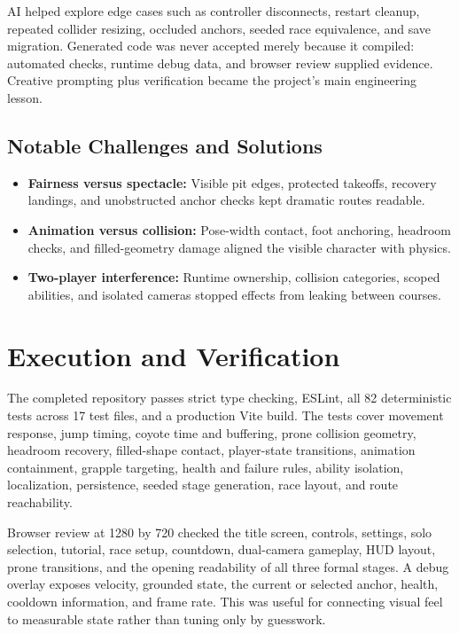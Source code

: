 \documentclass[11pt,letterpaper]{article}
\newcommand{\keyterm}[1]{\textbf{\color{navy}#1}}
\begin{document}
AI helped explore edge cases such as controller disconnects, restart cleanup, repeated collider resizing, occluded anchors, seeded race equivalence, and save migration. Generated code was never accepted merely because it compiled: automated checks, runtime debug data, and browser review supplied evidence. Creative prompting plus verification became the project's main engineering lesson.

\subsection{Notable Challenges and Solutions}

\begin{itemize}
  \item \keyterm{Fairness versus spectacle:} Visible pit edges, protected takeoffs, recovery landings, and unobstructed anchor checks kept dramatic routes readable.
  \item \keyterm{Animation versus collision:} Pose-width contact, foot anchoring, headroom checks, and filled-geometry damage aligned the visible character with physics.
  \item \keyterm{Two-player interference:} Runtime ownership, collision categories, scoped abilities, and isolated cameras stopped effects from leaking between courses.
\end{itemize}

\newpage

\section{Execution and Verification}

The completed repository passes strict type checking, ESLint, all 82 deterministic tests across 17 test files, and a production Vite build. The tests cover movement response, jump timing, coyote time and buffering, prone collision geometry, headroom recovery, filled-shape contact, player-state transitions, animation containment, grapple targeting, health and failure rules, ability isolation, localization, persistence, seeded stage generation, race layout, and route reachability.

Browser review at 1280 by 720 checked the title screen, controls, settings, solo selection, tutorial, race setup, countdown, dual-camera gameplay, HUD layout, prone transitions, and the opening readability of all three formal stages. A debug overlay exposes velocity, grounded state, the current or selected anchor, health, cooldown information, and frame rate. This was useful for connecting visual feel to measurable state rather than tuning only by guesswork.
\end{document}
